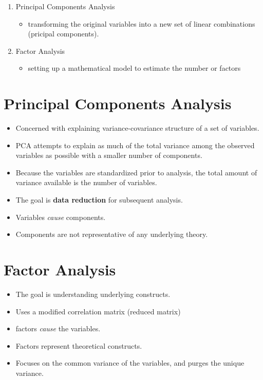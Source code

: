 \documentclass[
]{book}
\providecommand{\tightlist}{%
  \setlength{\itemsep}{0pt}\setlength{\parskip}{0pt}}
\begin{document}
\begin{enumerate}
\def\labelenumi{\arabic{enumi}.}
\item
  Principal Components Analysis

  \begin{itemize}
  \tightlist
  \item
    transforming the original variables into a new set of linear combinations (pricipal components).
  \end{itemize}
\item
  Factor Analysis

  \begin{itemize}
  \tightlist
  \item
    setting up a mathematical model to estimate the number or factors
  \end{itemize}
\end{enumerate}

\hypertarget{principal-components-analysis}{%
\section{Principal Components Analysis}\label{principal-components-analysis}}

\begin{itemize}
\tightlist
\item
  Concerned with explaining variance-covariance structure of a set of variables.
\item
  PCA attempts to explain as much of the total variance among the observed variables as possible with a smaller number of components.
\item
  Because the variables are standardized prior to analysis, the total amount of variance available is the number of variables.
\item
  The goal is \textbf{data reduction} for subsequent analysis.
\item
  Variables \emph{cause} components.
\item
  Components are not representative of any underlying theory.
\end{itemize}

\hypertarget{factor-analysis-1}{%
\section{Factor Analysis}\label{factor-analysis-1}}

\begin{itemize}
\tightlist
\item
  The goal is understanding underlying constructs.
\item
  Uses a modified correlation matrix (reduced matrix)
\item
  factors \emph{cause} the variables.
\item
  Factors represent theoretical constructs.
\item
  Focuses on the common variance of the variables, and purges the unique variance.
\end{itemize}
\end{document}
